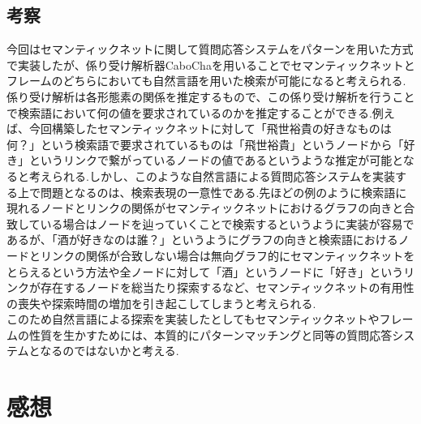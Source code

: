 \documentclass[a4j]{jarticle}
\begin{document}
\subsection{考察}
今回はセマンティックネットに関して質問応答システムをパターンを用いた方式で実装したが、係り受け解析器CaboChaを用いることでセマンティックネットとフレームのどちらにおいても自然言語を用いた検索が可能になると考えられる.係り受け解析は各形態素の関係を推定するもので、この係り受け解析を行うことで検索語において何の値を要求されているのかを推定することができる.例えば、今回構築したセマンティックネットに対して「飛世裕貴の好きなものは何？」という検索語で要求されているものは「飛世裕貴」というノードから「好き」というリンクで繋がっているノードの値であるというような推定が可能となると考えられる.しかし、このような自然言語による質問応答システムを実装する上で問題となるのは、検索表現の一意性である.先ほどの例のように検索語に現れるノードとリンクの関係がセマンティックネットにおけるグラフの向きと合致している場合はノードを辿っていくことで検索するというように実装が容易であるが、「酒が好きなのは誰？」というようにグラフの向きと検索語におけるノードとリンクの関係が合致しない場合は無向グラフ的にセマンティックネットをとらえるという方法や全ノードに対して「酒」というノードに「好き」というリンクが存在するノードを総当たり探索するなど、セマンティックネットの有用性の喪失や探索時間の増加を引き起こしてしまうと考えられる.\\
このため自然言語による探索を実装したとしてもセマンティックネットやフレームの性質を生かすためには、本質的にパターンマッチングと同等の質問応答システムとなるのではないかと考える.

\section{感想}
\end{document}

